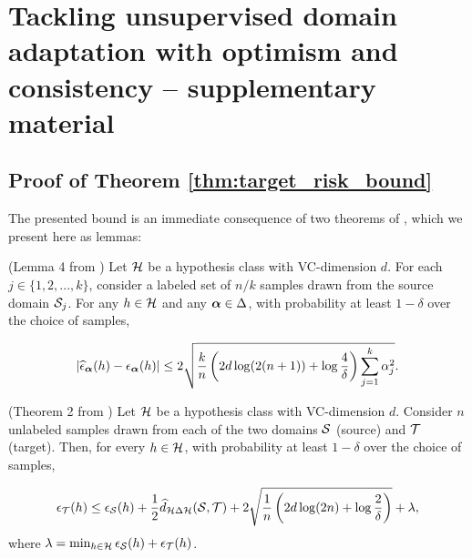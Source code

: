 
\chapter{Tackling unsupervised domain adaptation with optimism and consistency -- supplementary material} %

\label{appendix:modafm} %

\section{Proof of Theorem \ref{thm:target_risk_bound}}
\label{sec:thm_proof}

The presented bound is an immediate consequence of two theorems of \cite{BenDavid2010, Blitzer2008}, which we present here as lemmas:

\begin{lemma}
	\label{lemma:bound_mixture}
	(Lemma 4 from \citet{Blitzer2008}) Let ${\mathcal{H}}$ be a hypothesis class with VC-dimension $d$. For each $j \in \{1,2,...,k\}$, consider a labeled set of $n/k$ samples drawn from the source domain ${\mathcal{S}}_j$. For any $h \in {\mathcal{H}}$ and any ${\bm{\alpha}} \in \Delta$, with probability at least $1-\delta$ over the choice of samples,
	
	\begin{equation}
	|\widehat{\epsilon}_{\bm{\alpha}}(h) - \epsilon_{\bm{\alpha}}(h)| \leq 2\sqrt{\frac{k}{n} \left(2d\log(2(n+1)) + \log \frac{4}{\delta}\right) \sum_{j=1}^k {\alpha}_j^2}.
	\end{equation}
\end{lemma}

\begin{lemma}
	\label{lemma:bound_single_source}
	(Theorem 2 from \citet{BenDavid2010}) Let ${\mathcal{H}}$ be a hypothesis class with VC-dimension $d$. Consider $n$ unlabeled samples drawn from each of the two domains ${\mathcal{S}}$ (source) and ${\mathcal{T}}$ (target). Then, for every $h \in {\mathcal{H}}$, with probability at least $1-\delta$ over the choice of samples,
	
	\begin{equation}
	\epsilon_{\mathcal{T}}(h) \leq \epsilon_{\mathcal{S}}(h) + \frac{1}{2} \widehat{d}_{{\mathcal{H}} \Delta {\mathcal{H}}}({\mathcal{S}}, {\mathcal{T}}) + 2\sqrt{\frac{1}{n} \left( 2d\log(2n) + \log \frac{2}{\delta} \right)} + \lambda,
	\end{equation}    
	where $\lambda = \min_{h \in {\mathcal{H}}} \epsilon_{\mathcal{S}}(h) + \epsilon_{\mathcal{T}}(h)$.
\end{lemma}

